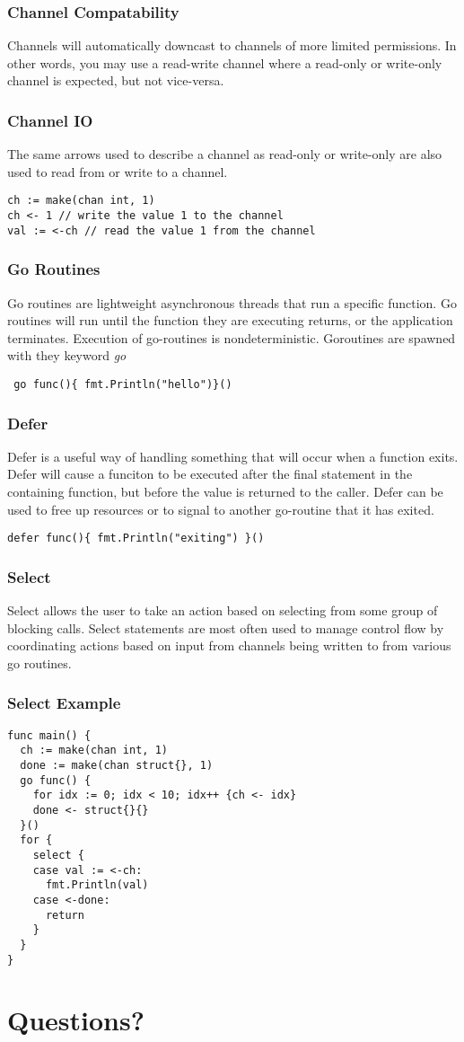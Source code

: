 \documentclass{beamer}
\begin{document}
\begin{frame}
  \frametitle{Channel Compatability}
  Channels will automatically downcast to channels of more limited
  permissions.  In other words, you may use a read-write channel where
  a read-only or write-only channel is expected, but not vice-versa.
\end{frame}

\begin{frame}[fragile]
  \frametitle{Channel IO}
  The same arrows used to describe a channel as read-only or
  write-only are also used to read from or write to a channel.
\begin{lstlisting}[language=Golang]
ch := make(chan int, 1)
ch <- 1 // write the value 1 to the channel
val := <-ch // read the value 1 from the channel
\end{lstlisting}
\end{frame}


\begin{frame}[fragile]
  \frametitle{Go Routines}
  Go routines are lightweight asynchronous threads that run a specific
  function.  Go routines will run until the function they are
  executing returns, or the application terminates.  Execution of
  go-routines is nondeterministic.  Goroutines are spawned with they
  keyword \emph{go}

  \verb! go func(){ fmt.Println("hello")}()!
\end{frame}

\begin{frame}[fragile]
  \frametitle{Defer}
  Defer is a useful way of handling something that will occur when a
  function exits.  Defer will cause a funciton to be executed after
  the final statement in the containing function, but before the value
  is returned to the caller.  Defer can be used to free up resources
  or to signal to another go-routine that it has exited.

  \verb!defer func(){ fmt.Println("exiting") }()!
\end{frame}

\begin{frame}
  \frametitle{Select}
  Select allows the user to take an action based on selecting from
  some group of blocking calls.  Select statements are most often used
  to manage control flow by coordinating actions based on input from
  channels being written to from various go routines.
\end{frame}

\begin{frame}[fragile]
  \frametitle{Select Example}
\begin{lstlisting}[language=Golang]
func main() {
  ch := make(chan int, 1)
  done := make(chan struct{}, 1)
  go func() {
    for idx := 0; idx < 10; idx++ {ch <- idx}
    done <- struct{}{}
  }()
  for {
    select {
    case val := <-ch:
      fmt.Println(val)
    case <-done:
      return
    }
  }
}
\end{lstlisting}
\end{frame}


\section{Questions?}
\end{document}
